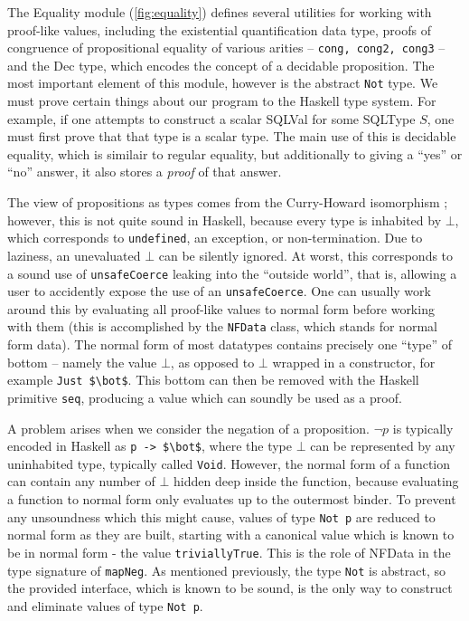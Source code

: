 \documentclass[12pt, svgnames]{article}
\begin{document}
The Equality module (\ref{fig:equality}) defines several utilities for working
with proof-like values, including the existential quantification data type,
proofs of congruence of propositional equality of various arities --
\lstinline{cong, cong2, cong3} -- and the Dec type, which encodes the concept of
a decidable proposition. The most important element of this module, however is
the abstract \lstinline{Not} type. We must prove certain things about our
program to the Haskell type system. For example, if one attempts to construct a
scalar SQLVal for some SQLType $S$, one must first prove that that type is a
scalar type. The main use of this is decidable equality, which is similair to
regular equality, but additionally to giving a ``yes'' or ``no'' answer, it also
stores a \emph{proof} of that answer.

 The view of propositions as types comes from the Curry-Howard
 isomorphism \cite{props}; however, this is not quite sound in Haskell, because
 every type is inhabited by $\bot$, which corresponds to \texttt{undefined}, an
 exception, or non-termination. Due to laziness, an unevaluated $\bot$ can be
 silently ignored. At worst, this corresponds to a sound use of
 \lstinline{unsafeCoerce} leaking into the ``outside world'', that is, allowing
 a user to accidently expose the use of an \lstinline{unsafeCoerce}. One can
 usually work around this by evaluating all proof-like values to normal form
 before working with them (this is accomplished by the \lstinline{NFData} class,
 which stands for normal form data). The normal form of most datatypes contains
 precisely one ``type'' of bottom -- namely the value $\bot$, as opposed to
 $\bot$ wrapped in a constructor, for example \lstinline{Just $\bot$}. This
 bottom can then be removed with the Haskell primitive \lstinline{seq},
 producing a value which can soundly be used as a proof.

A problem arises when we consider the negation of a proposition. $\lnot p$ is
typically encoded in Haskell as \lstinline{p -> $\bot$}, where the type $\bot$
can be represented by any uninhabited type, typically called
\lstinline{Void}. However, the normal form of a function can contain any number
of $\bot$ hidden deep inside the function, because evaluating a function to
normal form only evaluates up to the outermost binder.  To prevent any
unsoundness which this might cause, values of type \lstinline{Not p} are reduced
to normal form as they are built, starting with a canonical value which is known
to be in normal form - the value \lstinline{triviallyTrue}.  This is the role of
NFData in the type signature of \lstinline{mapNeg}.  As mentioned previously,
the type \lstinline{Not} is abstract, so the provided interface, which is known
to be sound, is the only way to construct and eliminate values of type
\lstinline{Not p}.
\end{document}
